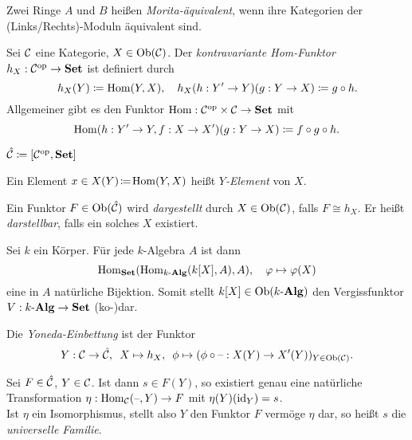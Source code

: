\documentclass{cheat-sheet}
\begin{document}

\begin{defn}
  Zwei Ringe $A$ und $B$ heißen \emph{Morita-äquivalent}, wenn ihre Kategorien der (Links/Rechts)-Moduln äquivalent sind.
\end{defn}


\begin{defn}
  Sei $\mathcal{C}$ eine Kategorie, $X \in \operatorname{Ob}(\mathcal{C})$. Der \emph{kontravariante Hom-Funktor} $h_X : \mathcal{C}^{\mathrm{op}} \to \mathbf{Set}$ ist definiert durch
  \[
    h_X(Y) \coloneqq \operatorname{Hom}(Y, X), \quad
    h_X(h : Y' \to Y)(g : Y \to X) \coloneqq g \circ h.
  \]
  Allgemeiner gibt es den Funktor $\operatorname{Hom} : \mathcal{C}^{\mathrm{op}} \times \mathcal{C} \to \mathbf{Set}$ mit
  \[
    \operatorname{Hom}(h : Y' \to Y, f : X \to X')(g : Y \to X) \coloneqq f \circ g \circ h.
  \]
\end{defn}

\begin{nota}
  $\hat{\mathcal{C}} \coloneqq [\mathcal{C}^{\mathrm{op}}, \mathbf{Set}]$
\end{nota}

\begin{defn}
  Ein Element $x \in X(Y) \!\coloneqq\! \operatorname{Hom}(Y, X)$ heißt \emph{$Y$-Element} von $X$.
\end{defn}

\begin{defn}
  Ein Funktor $F \in \operatorname{Ob}(\hat{\mathcal{C}})$ wird \emph{dargestellt} durch $X \in \operatorname{Ob}(\mathcal{C})$, falls $F \cong h_X$.
  Er heißt \emph{darstellbar}, falls ein solches $X$ existiert.
\end{defn}

\begin{bsp}
  Sei $k$ ein Körper. Für jede $k$-Algebra $A$ ist dann
  \[ \operatorname{Hom}_{\mathbf{Set}}(\operatorname{Hom}_{k\text{-}\mathbf{Alg}}(k[X], A), A), \quad \varphi \mapsto \varphi(X) \]
  eine in $A$ natürliche Bijektion. Somit stellt $k[X] \in \operatorname{Ob}(k\text{-}\mathbf{Alg})$ den Vergissfunktor $V : k\text{-}\mathbf{Alg} \to \mathbf{Set}$ (ko-)dar.
\end{bsp}

\begin{defn}
  Die \emph{Yoneda-Einbettung} ist der Funktor
  \[ Y : \mathcal{C} \to \hat{\mathcal{C}}, \enspace X \mapsto h_X, \enspace \phi \mapsto (\phi \circ \text{--} : X(Y) \to X'(Y))_{Y \in \operatorname{Ob}(\mathcal{C})}. \]
\end{defn}

\begin{lem}
  Sei $F \in \hat{\mathcal{C}}$, $Y \in \mathcal{C}$. Ist dann $s \in F(Y)$, so existiert genau eine natürliche Transformation $\eta : \operatorname{Hom}_{\mathcal{C}}(\text{--}, Y) \to F$ mit $\eta(Y)(\operatorname{id}_Y) = s$. \\
  Ist $\eta$ ein Isomorphismus, stellt also $Y$ den Funktor $F$ vermöge $\eta$ dar, so heißt $s$ die \emph{universelle Familie}.
\end{lem}
\end{document}
